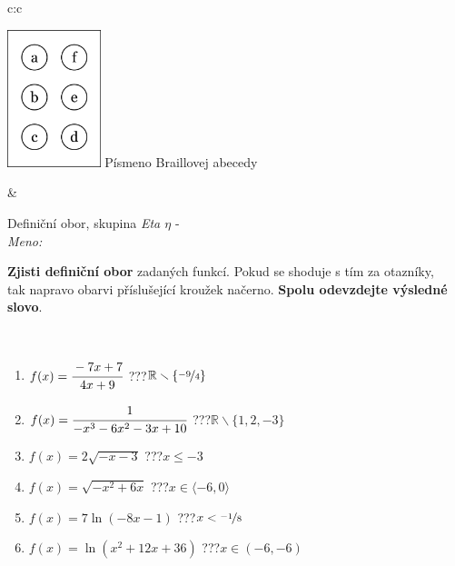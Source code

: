 \documentclass[10pt]{report}
\begin{document}
\begin{tabular}{c:c}
\begin{minipage}[c][104.5mm][t]{0.5\linewidth}
\begin{center}
\begin{minipage}{0.20\linewidth}
\begin{center}
\includegraphics[height=40mm]{../images/braille.png}
{\small Písmeno Braillovej abecedy}
\end{center}
\end{minipage}
\end{center}
\end{minipage}
&
\begin{minipage}[c][104.5mm][t]{0.5\linewidth}
\begin{center}
\vspace{7mm}
{\huge Definiční obor, skupina \textit{Eta $\eta$} -}\\[5mm]
\textit{Meno:}\phantom{xxxxxxxxxxxxxxxxxxxxxxxxxxxxxxxxxxxxxxxxxxxxxxxxxxxxxxxxxxxxxxxxx}\\[5mm]
\begin{minipage}{0.95\linewidth}
\textbf{Zjisti definiční obor} zadaných funkcí. Pokud se shoduje s tím za otazníky,\\tak napravo obarvi příslušející kroužek načerno. \textbf{Spolu odevzdejte výsledné slovo}.
\end{minipage}
\\[1mm]
\begin{minipage}{0.79\linewidth}
\begin{center}
\begin{varwidth}{\linewidth}
\begin{enumerate}
\normalsizerrr
\item $f(x)=\cfrac{-7x+7}{4x+9}$\quad \dotfill\; ???\;\dotfill \quad $\mathbb{R}\smallsetminus\{\nicefrac{-9}{4}\}$
\item $f(x)=\cfrac{1}{-x^3-6x^2-3x+10}$\quad \dotfill\; ???\;\dotfill \quad $\mathbb{R}\smallsetminus\{1,2,-3\}$
\item $f(x)=2\sqrt{-x-3}$\quad \dotfill\; ???\;\dotfill \quad $x\leq-3$
\item $f(x)=\sqrt{-x^2+6x}$\quad \dotfill\; ???\;\dotfill \quad $x\in\langle-6 , 0\rangle$
\item $f(x)=7\ln{(-8x-1)}$\quad \dotfill\; ???\;\dotfill \quad $x<\nicefrac{-1}{8}$
\item $f(x)=\ln{(x^2+12x+36)}$\quad \dotfill\; ???\;\dotfill \quad $x\in(-6 , -6)$

\end{enumerate}
\end{varwidth}
\end{center}
\end{minipage}
\end{center}
\end{minipage}
\end{tabular}
\end{document}
